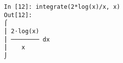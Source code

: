 ﻿\documentclass{article}
\begin{document}
\normalsize
\begin{Verbatim}
In [12]: integrate(2*log(x)/x, x)
Out[12]: 
⌠            
⎮ 2⋅log(x)   
⎮ ──────── dx
⎮    x       
⌡            
\end{Verbatim}
\end{document}
